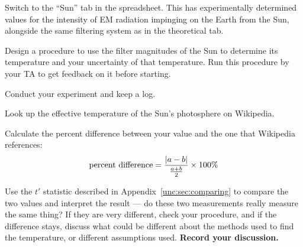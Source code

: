 \begin{steps}
	\item Switch to the ``Sun'' tab in the spreadsheet. This has experimentally determined values for the intensity of EM radiation impinging on the Earth from the Sun, alongside the same filtering system as in the theoretical tab.
	
	\item\label{ic:step:proc-color} Design a procedure to use the filter magnitudes of the Sun to determine its temperature and your uncertainty of that temperature. Run this procedure by your TA to get feedback on it before starting.
	
	\item Conduct your experiment and keep a log.
	
	\item Look up the effective temperature of the Sun's photosphere on Wikipedia.
	
	\item Calculate the percent difference between your value and the one that Wikipedia references:
	\begin{equation}
	 \textrm{percent difference} = \frac{\left\lvert a-b\right\rvert}{\frac{a+b}{2}} \times 100\%
	\end{equation}
	
	\item\label{ic:step:solar-compare} Use the $t'$ statistic described in Appendix\ \ref{unc:sec:comparing} to compare the two values and interpret the result --- do these two measurements really measure the same thing? If they are very different, check your procedure, and if the difference stays, discuss what could be different about the methods used to find the temperature, or different assumptions used. \textbf{Record your discussion.}
\end{steps}

